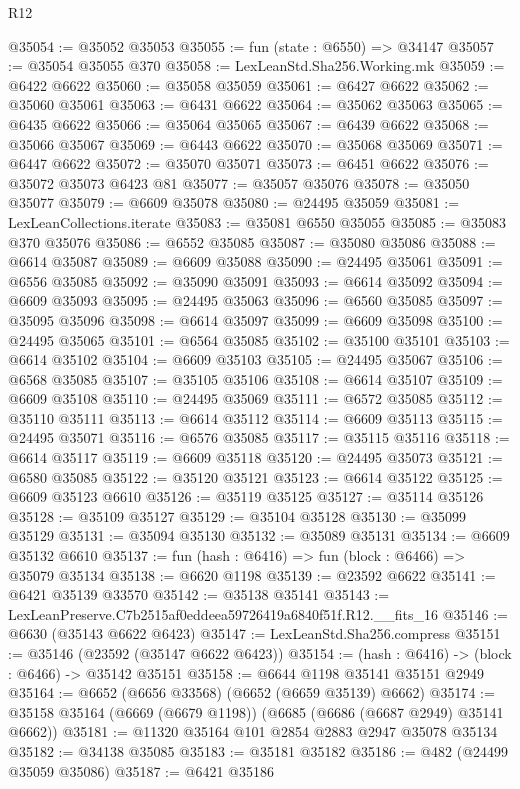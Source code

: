 \begin{lexlean}{R12}
\begin{coremodule}
@35054 := @35052 @35053
@35055 := fun (state : @6550) => @34147
@35057 := @35054 @35055 @370
@35058 := LexLeanStd.Sha256.Working.mk
@35059 := @6422 @6622
@35060 := @35058 @35059
@35061 := @6427 @6622
@35062 := @35060 @35061
@35063 := @6431 @6622
@35064 := @35062 @35063
@35065 := @6435 @6622
@35066 := @35064 @35065
@35067 := @6439 @6622
@35068 := @35066 @35067
@35069 := @6443 @6622
@35070 := @35068 @35069
@35071 := @6447 @6622
@35072 := @35070 @35071
@35073 := @6451 @6622
@35076 := @35072 @35073 @6423 @81
@35077 := @35057 @35076
@35078 := @35050 @35077
@35079 := @6609 @35078
@35080 := @24495 @35059
@35081 := LexLeanCollections.iterate
@35083 := @35081 @6550 @35055
@35085 := @35083 @370 @35076
@35086 := @6552 @35085
@35087 := @35080 @35086
@35088 := @6614 @35087
@35089 := @6609 @35088
@35090 := @24495 @35061
@35091 := @6556 @35085
@35092 := @35090 @35091
@35093 := @6614 @35092
@35094 := @6609 @35093
@35095 := @24495 @35063
@35096 := @6560 @35085
@35097 := @35095 @35096
@35098 := @6614 @35097
@35099 := @6609 @35098
@35100 := @24495 @35065
@35101 := @6564 @35085
@35102 := @35100 @35101
@35103 := @6614 @35102
@35104 := @6609 @35103
@35105 := @24495 @35067
@35106 := @6568 @35085
@35107 := @35105 @35106
@35108 := @6614 @35107
@35109 := @6609 @35108
@35110 := @24495 @35069
@35111 := @6572 @35085
@35112 := @35110 @35111
@35113 := @6614 @35112
@35114 := @6609 @35113
@35115 := @24495 @35071
@35116 := @6576 @35085
@35117 := @35115 @35116
@35118 := @6614 @35117
@35119 := @6609 @35118
@35120 := @24495 @35073
@35121 := @6580 @35085
@35122 := @35120 @35121
@35123 := @6614 @35122
@35125 := @6609 @35123 @6610
@35126 := @35119 @35125
@35127 := @35114 @35126
@35128 := @35109 @35127
@35129 := @35104 @35128
@35130 := @35099 @35129
@35131 := @35094 @35130
@35132 := @35089 @35131
@35134 := @6609 @35132 @6610
@35137 := fun (hash : @6416) => fun (block : @6466) => @35079 @35134
@35138 := @6620 @1198
@35139 := @23592 @6622
@35141 := @6421 @35139 @33570
@35142 := @35138 @35141
@35143 := LexLeanPreserve.C7b2515af0eddeea59726419a6840f51f.R12.__fits_16
@35146 := @6630 (@35143 @6622 @6423)
@35147 := LexLeanStd.Sha256.compress
@35151 := @35146 (@23592 (@35147 @6622 @6423))
@35154 := (hash : @6416) -> (block : @6466) -> @35142 @35151
@35158 := @6644 @1198 @35141 @35151 @2949
@35164 := @6652 (@6656 @33568) (@6652 (@6659 @35139) @6662)
@35174 := @35158 @35164 (@6669 (@6679 @1198)) (@6685 (@6686 (@6687 @2949) @35141 @6662))
@35181 := @11320 @35164 @101 @2854 @2883 @2947 @35078 @35134
@35182 := @34138 @35085
@35183 := @35181 @35182
@35186 := @482 (@24499 @35059 @35086)
@35187 := @6421 @35186

\end{coremodule}
\end{lexlean}
